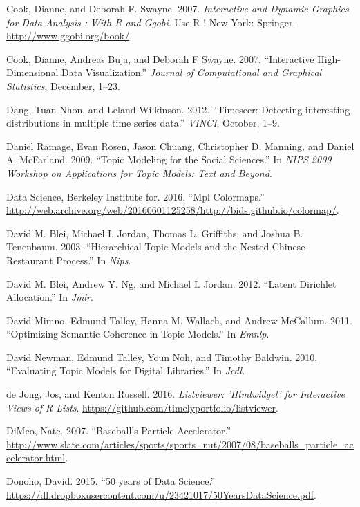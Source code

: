 \documentclass[12pt,]{isuthesis}
\begin{document}
\hypertarget{ref-ggobi:2007}{}
Cook, Dianne, and Deborah F. Swayne. 2007. \emph{Interactive and Dynamic
Graphics for Data Analysis : With R and Ggobi}. Use R ! New York:
Springer. \url{http://www.ggobi.org/book/}.

\hypertarget{ref-Cook:2007uk}{}
Cook, Dianne, Andreas Buja, and Deborah F Swayne. 2007. ``Interactive
High-Dimensional Data Visualization.'' \emph{Journal of Computational
and Graphical Statistics}, December, 1--23.

\hypertarget{ref-Wilkinson:2012}{}
Dang, Tuan Nhon, and Leland Wilkinson. 2012. ``Timeseer: Detecting
interesting distributions in multiple time series data.'' \emph{VINCI},
October, 1--9.

\hypertarget{ref-Ramage}{}
Daniel Ramage, Evan Rosen, Jason Chuang, Christopher D. Manning, and
Daniel A. McFarland. 2009. ``Topic Modeling for the Social Sciences.''
In \emph{NIPS 2009 Workshop on Applications for Topic Models: Text and
Beyond}.

\hypertarget{ref-viridis}{}
Data Science, Berkeley Institute for. 2016. ``Mpl Colormaps.''
\url{http://web.archive.org/web/20160601125258/http://bids.github.io/colormap/}.

\hypertarget{ref-Blei-hierarchical}{}
David M. Blei, Michael I. Jordan, Thomas L. Griffiths, and Joshua B.
Tenenbaum. 2003. ``Hierarchical Topic Models and the Nested Chinese
Restaurant Process.'' In \emph{Nips}.

\hypertarget{ref-Blei-2003}{}
David M. Blei, Andrew Y. Ng, and Michael I. Jordan. 2012. ``Latent
Dirichlet Allocation.'' In \emph{Jmlr}.

\hypertarget{ref-Mimno}{}
David Mimno, Edmund Talley, Hanna M. Wallach, and Andrew McCallum. 2011.
``Optimizing Semantic Coherence in Topic Models.'' In \emph{Emnlp}.

\hypertarget{ref-Newman-JCDL}{}
David Newman, Edmund Talley, Youn Noh, and Timothy Baldwin. 2010.
``Evaluating Topic Models for Digital Libraries.'' In \emph{Jcdl}.

\hypertarget{ref-listviewer}{}
de Jong, Jos, and Kenton Russell. 2016. \emph{Listviewer: 'Htmlwidget'
for Interactive Views of R Lists}.
\url{https://github.com/timelyportfolio/listviewer}.

\hypertarget{ref-slate}{}
DiMeo, Nate. 2007. ``Baseball's Particle Accelerator.''
\url{http://www.slate.com/articles/sports/sports_nut/2007/08/baseballs_particle_accelerator.html}.

\hypertarget{ref-Donoho:2015tu}{}
Donoho, David. 2015. ``50 years of Data Science.''
\url{https://dl.dropboxusercontent.com/u/23421017/50YearsDataScience.pdf}.
\end{document}
